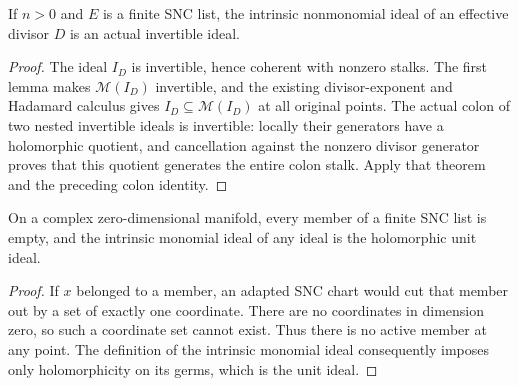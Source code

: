 \begin{lemma}
\label{hir:intrinsic-divisor-nonmonomial-invertible}
\leanok
If $n>0$ and $E$ is a finite SNC list, the intrinsic nonmonomial ideal
of an effective divisor $D$ is an actual invertible ideal.
\end{lemma}
\begin{proof}
The ideal $I_D$ is invertible, hence coherent with nonzero stalks.
The first lemma makes $\mathcal M(I_D)$ invertible, and the existing
divisor-exponent and Hadamard calculus gives
$I_D\subseteq\mathcal M(I_D)$ at all original points.
The actual colon of two nested invertible ideals is invertible: locally
their generators have a holomorphic quotient, and cancellation against
the nonzero divisor generator proves that this quotient generates the
entire colon stalk.  Apply that theorem and the preceding colon identity.
\end{proof}

\begin{lemma}
\label{hir:snc-dimension-zero-empty}
\leanok
On a complex zero-dimensional manifold, every member of a finite SNC
list is empty, and the intrinsic monomial ideal of any ideal is the
holomorphic unit ideal.
\end{lemma}
\begin{proof}
If $x$ belonged to a member, an adapted SNC chart would cut that member
out by a set of exactly one coordinate.  There are no coordinates in
dimension zero, so such a coordinate set cannot exist.
Thus there is no active member at any point.  The definition of the
intrinsic monomial ideal consequently imposes only holomorphicity on
its germs, which is the unit ideal.
\end{proof}

